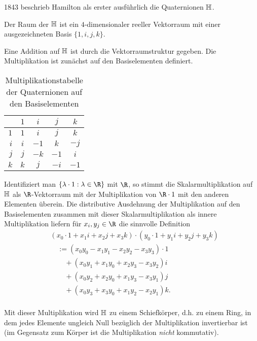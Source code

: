 1843 beschrieb Hamilton als erster ausführlich die Quaternionen $\mathbb{H}$.

\begin{df}
	Der Raum der  $\mathbb{H}$ ist ein $4$-dimensionaler reeller Vektorraum mit einer ausgezeichneten Basis $\{1, i, j, k\}$.

	Eine Addition auf $\mathbb{H}$ ist durch die Vektorraumstruktur gegeben.
	Die Multiplikation ist zunächst auf den Basiselementen definiert.
	\begin{table}[ht]
		\centering
		\begin{tabular}{r|cccc}
			  & $1$ & $i$ & $j$ & $k$ \\ \hline
			$1$ & $1$ & $i$ & $j$ & $k$ \\
			$i$ & $i$ & $-1$ & $k$ & $-j$ \\
			$j$ & $j$ & $-k$ & $-1$ & $i$ \\
			$k$ & $k$ & $j$ & $-i$ & $-1$
		\end{tabular}
		\caption{Multiplikationstabelle der Quaternionen auf den Basiselementen}
	\end{table}

	Identifiziert man $\{ \lambda \cdot 1 : \lambda \in \R \}$ mit $\R$, so stimmt die Skalarmultiplikation auf $\mathbb{H}$ als $\R$-Vektorraum mit der Multiplikation von $\R \cdot 1$ mit den anderen Elementen überein.
	Die distributive Ausdehnung der Multiplikation auf den Basiselementen zusammen mit dieser Skalarmultiplikation als innere Multiplikation liefern für $x_i, y_j \in \R$ die sinnvolle Definition
	\begin{align*}
		&(x_0 \cdot 1  + x_1 i + x_2 j + x_3 k) \cdot (y_0 \cdot 1 + y_1 i + y_2 j + y_3 k) \\
		&\quad := ( x_0 y_0 - x_1 y_1 - x_2 y_2 - x_3 y_3) \cdot 1 \\
		&\qquad + ( x_0 y_1 + x_1 y_0 + x_2 y_3 - x_3 y_2) i \\
		&\qquad + ( x_0 y_2 + x_2 y_0 + x_1 y_3 - x_3 y_1) j \\
		&\qquad + ( x_0 y_3 + x_3 y_0 + x_1 y_2 - x_2 y_1) k. \\
	\end{align*}
	\begin{note}
		Mit dieser Multiplikation wird $\mathbb{H}$ zu einem Schiefkörper, d.h. zu einem Ring, in dem jedes Elemente ungleich Null bezüglich der Multiplikation invertierbar ist (im Gegensatz zum Körper ist die Multiplikation \emph{nicht} kommutativ).
	\end{note}
\end{df}


